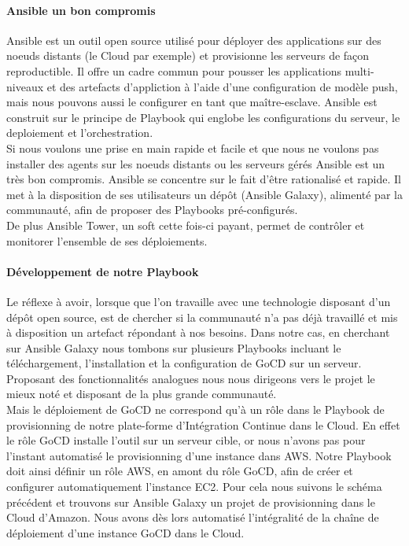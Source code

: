           \paragraph{Ansible un bon compromis}\label{Ansible}
          Ansible est un outil open source utilisé pour déployer des applications sur des noeuds distants (le Cloud par exemple) et provisionne les serveurs de façon reproductible. Il offre un cadre commun pour pousser les applications multi-niveaux et des artefacts d'appliction à l'aide d'une configuration de modèle push, mais nous pouvons aussi le configurer en tant que maître-esclave. Ansible est construit sur le principe de Playbook qui englobe les configurations du serveur, le deploiement et l'orchestration.\\

          Si nous voulons une prise en main rapide et facile et que nous ne voulons pas installer des agents sur les noeuds distants ou les serveurs gérés Ansible est un très bon compromis. Ansible se concentre sur le fait d'être rationalisé et rapide. Il met à la disposition de ses utilisateurs un dépôt (Ansible Galaxy), alimenté par la communauté, afin de proposer des Playbooks pré-configurés.\\

          De plus Ansible Tower, un soft cette fois-ci payant, permet de contrôler et monitorer l'ensemble de ses déploiements.

          \paragraph{Développement de notre Playbook}
          Le réflexe à avoir, lorsque que l'on travaille avec une technologie disposant d'un dépôt open source, est de chercher si la communauté n'a pas déjà travaillé et mis à disposition un artefact répondant à nos besoins. Dans notre cas, en cherchant sur Ansible Galaxy nous tombons sur plusieurs Playbooks incluant le téléchargement, l'installation et la configuration de GoCD sur un serveur. Proposant des fonctionnalités analogues nous nous dirigeons vers le projet le mieux noté et disposant de la plus grande communauté.\\

          Mais le déploiement de GoCD ne correspond qu'à un rôle dans le Playbook de provisionning de notre plate-forme d'Intégration Continue dans le Cloud. En effet le rôle GoCD installe l'outil sur un serveur cible, or nous n'avons pas pour l'instant automatisé le provisionning d'une instance dans AWS. Notre Playbook doit ainsi définir un rôle AWS, en amont du rôle GoCD, afin de créer et configurer automatiquement l'instance EC2. Pour cela nous suivons le schéma précédent et trouvons sur Ansible Galaxy un projet de provisionning dans le Cloud d'Amazon. Nous avons dès lors automatisé l'intégralité de la chaîne de déploiement d'une instance GoCD dans le Cloud.\\

